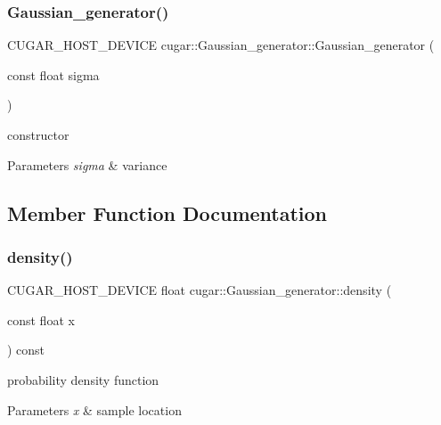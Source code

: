 \subsubsection{\texorpdfstring{Gaussian\+\_\+generator()}{Gaussian\_generator()}}
{\footnotesize\ttfamily C\+U\+G\+A\+R\+\_\+\+H\+O\+S\+T\+\_\+\+D\+E\+V\+I\+CE cugar\+::\+Gaussian\+\_\+generator\+::\+Gaussian\+\_\+generator (\begin{DoxyParamCaption}\item[{const float}]{sigma }\end{DoxyParamCaption})\hspace{0.3cm}{\ttfamily [inline]}}

constructor


\begin{DoxyParams}{Parameters}
{\em sigma} & variance \\
\hline
\end{DoxyParams}


\subsection{Member Function Documentation}
\mbox{\label{structcugar_1_1_gaussian__generator_ae2234cab60f8a190b135b6e1dc0735fb}} 
\subsubsection{\texorpdfstring{density()}{density()}}
{\footnotesize\ttfamily C\+U\+G\+A\+R\+\_\+\+H\+O\+S\+T\+\_\+\+D\+E\+V\+I\+CE float cugar\+::\+Gaussian\+\_\+generator\+::density (\begin{DoxyParamCaption}\item[{const float}]{x }\end{DoxyParamCaption}) const\hspace{0.3cm}{\ttfamily [inline]}}

probability density function


\begin{DoxyParams}{Parameters}
{\em x} & sample location \\
\hline
\end{DoxyParams}
\mbox{\label{structcugar_1_1_gaussian__generator_a05e4e7489ee54bbcc2bbd80446f6e088}} 
